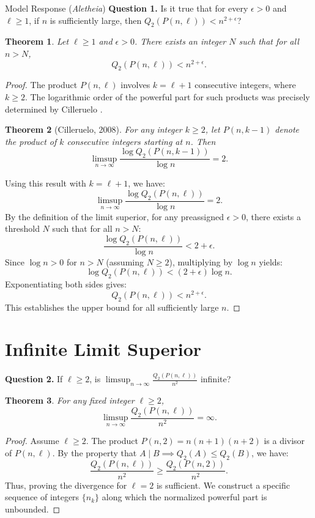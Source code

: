 \documentclass[11pt]{article}
\newcommand{\Qtwo}{Q_2}
\newtheorem{theorem}{Theorem}
\begin{document}
\begin{solution}{Model Response (\emph{Aletheia})}
\textbf{Question 1.} Is it true that for every $\epsilon > 0$ and $\ell \ge 1$, if $n$ is sufficiently large, then $\Qtwo(P(n, \ell)) < n^{2+\epsilon}$?

\begin{theorem}
Let $\ell \ge 1$ and $\epsilon > 0$. There exists an integer $N$ such that for all $n > N$,
\[ \Qtwo(P(n, \ell)) < n^{2+\epsilon}. \]
\end{theorem}

\begin{proof}
The product $P(n, \ell)$ involves $k = \ell + 1$ consecutive integers, where $k \ge 2$. The logarithmic order of the powerful part for such products was precisely determined by Cilleruelo \cite{Cilleruelo2008}.

\begin{theorem}[Cilleruelo, 2008]
For any integer $k \ge 2$, let $P(n, k-1)$ denote the product of $k$ consecutive integers starting at $n$. Then
\[ \limsup_{n \to \infty} \frac{\log \Qtwo(P(n, k-1))}{\log n} = 2. \]
\end{theorem}

Using this result with $k = \ell + 1$, we have:
\[ \limsup_{n \to \infty} \frac{\log \Qtwo(P(n, \ell))}{\log n} = 2. \]
By the definition of the limit superior, for any preassigned $\epsilon > 0$, there exists a threshold $N$ such that for all $n > N$:
\[ \frac{\log \Qtwo(P(n, \ell))}{\log n} < 2 + \epsilon. \]
Since $\log n > 0$ for $n > N$ (assuming $N \ge 2$), multiplying by $\log n$ yields:
\[ \log \Qtwo(P(n, \ell)) < (2+\epsilon) \log n. \]
Exponentiating both sides gives:
\[ \Qtwo(P(n, \ell)) < n^{2+\epsilon}. \]
This establishes the upper bound for all sufficiently large $n$.
\end{proof}

\section{Infinite Limit Superior}

\textbf{Question 2.} If $\ell \ge 2$, is $\limsup_{n\to \infty}\frac{\Qtwo(P(n, \ell))}{n^2}$ infinite?

\begin{theorem}
For any fixed integer $\ell \ge 2$,
\[ \limsup_{n \to \infty} \frac{\Qtwo(P(n, \ell))}{n^2} = \infty. \]
\end{theorem}

\begin{proof}
Assume $\ell \ge 2$. The product $P(n, 2) = n(n+1)(n+2)$ is a divisor of $P(n, \ell)$. By the property that $A \mid B \implies \Qtwo(A) \le \Qtwo(B)$, we have:
\[ \frac{\Qtwo(P(n, \ell))}{n^2} \ge \frac{\Qtwo(P(n, 2))}{n^2}. \]
Thus, proving the divergence for $\ell=2$ is sufficient. We construct a specific sequence of integers $\{n_k\}$ along which the normalized powerful part is unbounded.


\end{proof}
\end{solution}
\end{document}
